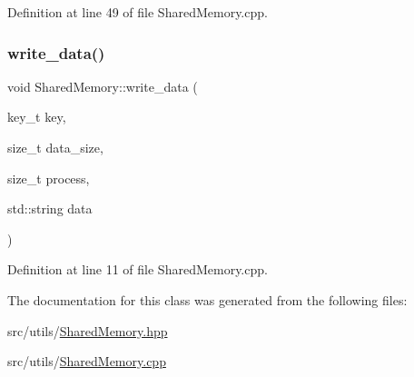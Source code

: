 Definition at line 49 of file Shared\+Memory.\+cpp.

\mbox{\label{class_shared_memory_a49a12f61b3b8bd4811a1351c434dd121}} 
\subsubsection{\texorpdfstring{write\+\_\+data()}{write\_data()}}
{\footnotesize\ttfamily void Shared\+Memory\+::write\+\_\+data (\begin{DoxyParamCaption}\item[{key\+\_\+t}]{key,  }\item[{size\+\_\+t}]{data\+\_\+size,  }\item[{size\+\_\+t}]{process,  }\item[{std\+::string}]{data }\end{DoxyParamCaption})}



Definition at line 11 of file Shared\+Memory.\+cpp.



The documentation for this class was generated from the following files\+:\begin{DoxyCompactItemize}
\item 
src/utils/\hyperlink{_shared_memory_8hpp}{Shared\+Memory.\+hpp}\item 
src/utils/\hyperlink{_shared_memory_8cpp}{Shared\+Memory.\+cpp}\end{DoxyCompactItemize}
